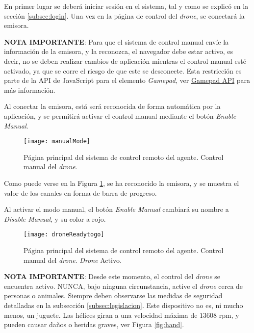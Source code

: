 En primer lugar se deberá iniciar sesión en el sistema, tal y como se explicó en la sección \ref{subsec:login}. 
Una vez en la página de control del \emph{drone}, se conectará la emisora.

\noindent \textbf{NOTA IMPORTANTE}: Para que el sistema de control manual envíe la información de la emisora, y la reconozca, el navegador debe estar activo, es decir, no se deben realizar cambios de aplicación mientras el control manual esté activado, ya que se corre el riesgo de que este se desconecte. Esta restricción es parte de la API de JavaScript para el elemento \emph{Gamepad}, ver \href{https://developer.mozilla.org/en-US/docs/Web/API/Gamepad_API/Using_the_Gamepad_API}{Gamepad API} para más información.


Al conectar la emisora, está será reconocida de forma automática por la aplicación, y se permitirá activar el control manual mediante el botón \emph{Enable Manual}. 

\begin{figure}[H]
	\centering
	\texttt{[image: manualMode]}
	\caption[Página principal. Gestión de control manual.]{Página principal del sistema de control remoto del agente. Control manual del \emph{drone}.}\label{fig:manualMode}
\end{figure}

Como puede verse en la Figura \ref{fig:manualMode}, se ha reconocido la emisora, y se muestra el valor de los canales en forma de barra de progreso. 


Al activar el modo manual, el botón \emph{Enable Manual} cambiará su nombre a \emph{Disable Manual}, y su color a rojo. 

\begin{figure}[H]
	\centering
	\texttt{[image: droneReadytogo]}
	\caption[Página principal. Gestión de control manual. Activación]{Página principal del sistema de control remoto del agente. Control manual del \emph{drone}. \emph{Drone} Activo.}\label{fig:droneReadytogo}
\end{figure}


\noindent \textbf{NOTA IMPORTANTE}: Desde este momento, el control del \emph{drone} se encuentra activo. NUNCA, bajo ninguna circunstancia, active el \emph{drone} cerca de personas o animales. Siempre deben observarse las medidas de seguridad detalladas en la subsección \ref{subsec:legislacion}. Este dispositivo no es, ni mucho menos, un juguete. Las hélices giran a una velocidad máxima de $13608$ rpm, y pueden causar daños o heridas graves, ver Figura \ref{fig:hand}. 

